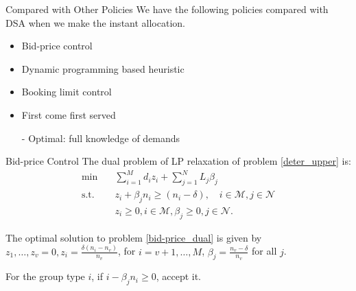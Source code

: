     \begin{frame}{Compared with Other Policies}
      We have the following policies compared with DSA when we make the instant allocation.
      
      \vspace{0.5cm}
      
      \begin{itemize}
        \item Bid-price control
        \item Dynamic programming based heuristic
        \item Booking limit control
        \item First come first served
        \item[-] Optimal: full knowledge of demands
      \end{itemize}
    \end{frame}

      \begin{frame}{Bid-price Control}
        The dual problem of LP relaxation of problem \eqref{deter_upper} is:
        \begin{equation}\label{bid-price_dual}
          \begin{aligned}
          \min \quad & \sum_{i=1}^{M} d_i z_i + \sum_{j= 1}^{N} L_j \beta_{j} \\
          \text {s.t.} \quad & z_{i} + \beta_j n_i \geq (n_i-\delta), \quad i \in \mathcal{M}, j \in \mathcal{N} \\
          & z_{i} \geq 0, i \in \mathcal{M}, \beta_{j} \geq 0, j \in \mathcal{N}.
          \end{aligned}
        \end{equation}
        
        \small
        
        The optimal solution to problem \eqref{bid-price_dual} is given by $z_1, \ldots, z_v =0, z_i = \frac{\delta (n_i - n_v)}{n_v}$, for $i = v + 1, \ldots, M$, $\beta_j = \frac{n_v - \delta}{n_v}$ for all $j$.
        \vspace{0.5cm}

        For the group type $i$, if $i - \beta_j n_i \geq 0$, accept it. 
      \end{frame}

